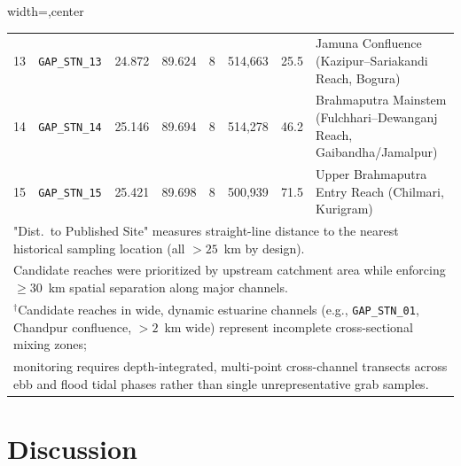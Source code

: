 \documentclass[authoryear,preprint,12pt]{elsarticle}
\begin{document}
\begin{table}[htbp]
\begin{adjustbox}{width=\textwidth,center}
\begin{tabular}{clcccccl}
13 & \texttt{GAP\_STN\_13} & 24.872 & 89.624 & 8 & 514,663 & 25.5 & Jamuna Confluence (Kazipur--Sariakandi Reach, Bogura) \\
14 & \texttt{GAP\_STN\_14} & 25.146 & 89.694 & 8 & 514,278 & 46.2 & Brahmaputra Mainstem (Fulchhari--Dewanganj Reach, Gaibandha/Jamalpur) \\
15 & \texttt{GAP\_STN\_15} & 25.421 & 89.698 & 8 & 500,939 & 71.5 & Upper Brahmaputra Entry Reach (Chilmari, Kurigram) \\
\bottomrule
\multicolumn{8}{l}{\footnotesize "Dist.\ to Published Site" measures straight-line distance to the nearest historical sampling location (all $>25$~km by design).} \\
\multicolumn{8}{l}{\footnotesize Candidate reaches were prioritized by upstream catchment area while enforcing $\ge 30$~km spatial separation along major channels.} \\
\multicolumn{8}{l}{\footnotesize $^\dagger$Candidate reaches in wide, dynamic estuarine channels (e.g., \texttt{GAP\_STN\_01}, Chandpur confluence, $>2$~km wide) represent incomplete cross-sectional mixing zones;} \\
\multicolumn{8}{l}{\footnotesize monitoring requires depth-integrated, multi-point cross-channel transects across ebb and flood tidal phases rather than single unrepresentative grab samples.} \\
\end{tabular}
\end{adjustbox}
\end{table}

\section{Discussion}
\end{document}
